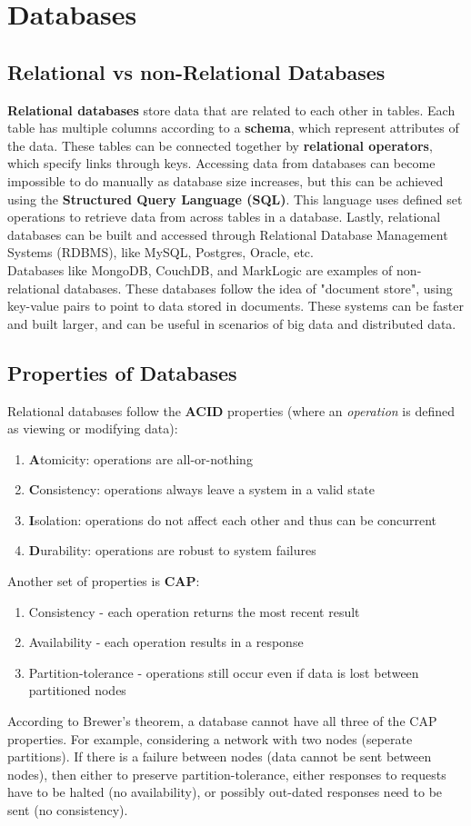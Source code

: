 \documentclass[12pt]{article}
\begin{document}
\section{Databases}
\subsection{Relational vs non-Relational Databases}
{\bf Relational databases} store data that are related to each other in tables. Each table has multiple columns according to a {\bf schema}, which represent attributes of the data. These tables can be connected together by {\bf relational operators}, which specify links through keys. Accessing data from databases can become impossible to do manually as database size increases, but this can be achieved using the {\bf Structured Query Language (SQL)}. This language uses defined set operations to retrieve data from across tables in a database. Lastly, relational databases can be built and accessed through Relational Database Management Systems (RDBMS), like MySQL, Postgres, Oracle, etc.\\[10pt]
Databases like MongoDB, CouchDB, and MarkLogic are examples of non-relational databases. These databases follow the idea of "document store", using key-value pairs to point to data stored in documents. These systems can be faster and built larger, and can be useful in scenarios of big data and distributed data. 

\subsection{Properties of Databases}
Relational databases follow the {\bf ACID} properties (where an \textit{operation} is defined as viewing or modifying data):
\begin{enumerate}
    \item {\bf A}tomicity: operations are all-or-nothing
    \item {\bf C}onsistency: operations always leave a system in a valid state
    \item {\bf I}solation: operations do not affect each other and thus can be concurrent
    \item {\bf D}urability: operations are robust to system failures
\end{enumerate}
Another set of properties is {\bf CAP}:
\begin{enumerate}
    \item Consistency - each operation returns the most recent result
    \item Availability - each operation results in a response
    \item Partition-tolerance - operations still occur even if data is lost between partitioned nodes
\end{enumerate}
According to Brewer's theorem, a database cannot have all three of the CAP properties. For example, considering a network with two nodes (seperate partitions). If there is a failure between nodes (data cannot be sent between nodes), then either to preserve partition-tolerance, either responses to requests have to be halted (no availability), or possibly out-dated responses need to be sent (no consistency).
\end{document}
